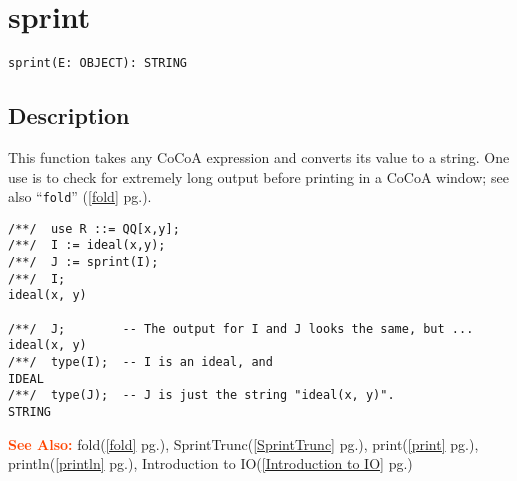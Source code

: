 \documentclass[a4paper]{mybook}
\newenvironment{command}{}{} %
\newcommand\SeeAlso{\par\textcolor{OrangeRed}{\textbf{\large See Also: }}}
\begin{document}
\section{sprint}
\label{sprint}
\begin{command} %


\begin{Verbatim}[label=syntax, rulecolor=\color{MidnightBlue},
frame=single]
sprint(E: OBJECT): STRING
\end{Verbatim}


\subsection*{Description}

This function takes any CoCoA expression and converts its value to a
string.  One use is to check for extremely long output before printing
in a CoCoA window; see also ``\verb&fold&'' (\ref{fold} pg.\pageref{fold}).
\begin{Verbatim}[label=example, rulecolor=\color{PineGreen}, frame=single]
/**/  use R ::= QQ[x,y];
/**/  I := ideal(x,y);
/**/  J := sprint(I);
/**/  I;
ideal(x, y)

/**/  J;        -- The output for I and J looks the same, but ...
ideal(x, y)
/**/  type(I);  -- I is an ideal, and
IDEAL
/**/  type(J);  -- J is just the string "ideal(x, y)".
STRING
\end{Verbatim}


\SeeAlso %
  fold(\ref{fold} pg.\pageref{fold}), 
    SprintTrunc(\ref{SprintTrunc} pg.\pageref{SprintTrunc}), 
    print(\ref{print} pg.\pageref{print}), 
    println(\ref{println} pg.\pageref{println}), 
    Introduction to IO(\ref{Introduction to IO} pg.\pageref{Introduction to IO})
\end{command} %
\end{document}
